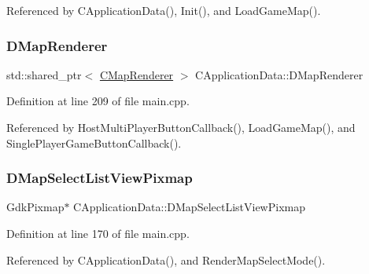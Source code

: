 Referenced by C\+Application\+Data(), Init(), and Load\+Game\+Map().

\hypertarget{classCApplicationData_afaf62b458bd7a0ec93ab9f063d7ea8d7}{}\label{classCApplicationData_afaf62b458bd7a0ec93ab9f063d7ea8d7} 
\subsubsection{\texorpdfstring{D\+Map\+Renderer}{DMapRenderer}}
{\footnotesize\ttfamily std\+::shared\+\_\+ptr$<$ \hyperlink{classCMapRenderer}{C\+Map\+Renderer} $>$ C\+Application\+Data\+::\+D\+Map\+Renderer\hspace{0.3cm}{\ttfamily [protected]}}



Definition at line 209 of file main.\+cpp.



Referenced by Host\+Multi\+Player\+Button\+Callback(), Load\+Game\+Map(), and Single\+Player\+Game\+Button\+Callback().

\hypertarget{classCApplicationData_a76e4af228d69ca3c6b1cf0770ca2e7a0}{}\label{classCApplicationData_a76e4af228d69ca3c6b1cf0770ca2e7a0} 
\subsubsection{\texorpdfstring{D\+Map\+Select\+List\+View\+Pixmap}{DMapSelectListViewPixmap}}
{\footnotesize\ttfamily Gdk\+Pixmap$\ast$ C\+Application\+Data\+::\+D\+Map\+Select\+List\+View\+Pixmap\hspace{0.3cm}{\ttfamily [protected]}}



Definition at line 170 of file main.\+cpp.



Referenced by C\+Application\+Data(), and Render\+Map\+Select\+Mode().

\hypertarget{classCApplicationData_a5e5746ba44c03038d1a392872614de14}{}\label{classCApplicationData_a5e5746ba44c03038d1a392872614de14} 
